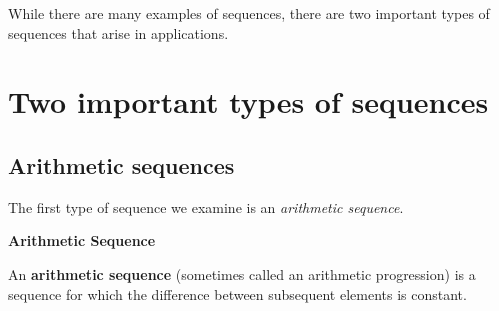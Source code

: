 \documentclass{ximera}
\begin{document}
While there are many examples of sequences, there are two important types of sequences that arise in applications.
















\section{Two important types of sequences}

\subsection{Arithmetic sequences}

The first type of sequence we examine is an \emph{arithmetic sequence}.  

\begin{definition}  \textbf{\textcolor{green!50!black}{Arithmetic Sequence}} 


  An \textbf{arithmetic sequence} (sometimes called an arithmetic
  progression) is a sequence for which the
  difference between subsequent elements is constant.
\end{definition}
\end{document}
